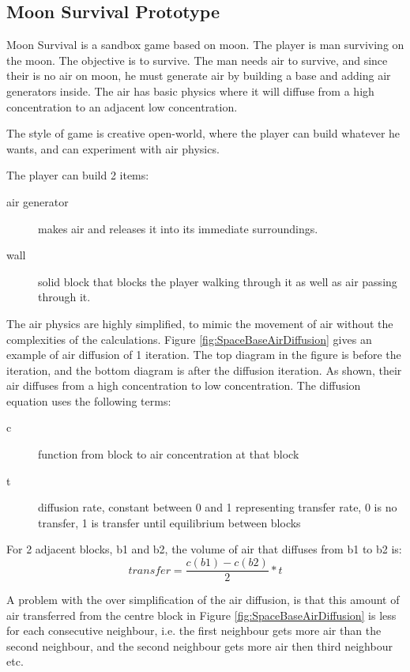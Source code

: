 \subsection{Moon Survival Prototype}


Moon Survival is a sandbox game based on moon.
The player is man surviving on the moon.
The objective is to survive.
The man needs air to survive, and since their is no air on moon, he must generate air by building a base and adding air generators inside.
The air has basic physics where it will diffuse from a high concentration to an adjacent low concentration.

The style of game is creative open-world, where the player can build whatever he wants, and can experiment with air physics.

The player can build 2 items: 
\begin{description}
\item[air generator] makes air and releases it into its immediate surroundings. 
\item[wall] solid block that blocks the player walking through it as well as air passing through it.
\end{description}

The air physics are highly simplified, to mimic the movement of air without the complexities of the calculations.
Figure \ref{fig:SpaceBaseAirDiffusion} gives an example of air diffusion of 1 iteration. The top diagram in the figure is before the iteration, and the bottom diagram is after the diffusion iteration.
As shown, their air diffuses from a high concentration to low concentration.
The diffusion equation uses the following terms:
\begin{description}
\item[c] function from block to air concentration at that block
\item[t] diffusion rate, constant between 0 and 1 representing transfer rate, 0 is no transfer, 1 is transfer until equilibrium between blocks
\end{description}

For 2 adjacent blocks, b1 and b2, the volume of air that diffuses from b1 to b2 is:
$$ transfer = \frac{c(b1) - c(b2)}{2} * t $$

A problem with the over simplification of the air diffusion, is that this amount of air transferred from the centre block in Figure \ref{fig:SpaceBaseAirDiffusion} is less for each consecutive neighbour, i.e. the first neighbour gets more air than the second neighbour, and the second neighbour gets more air then third neighbour etc.

